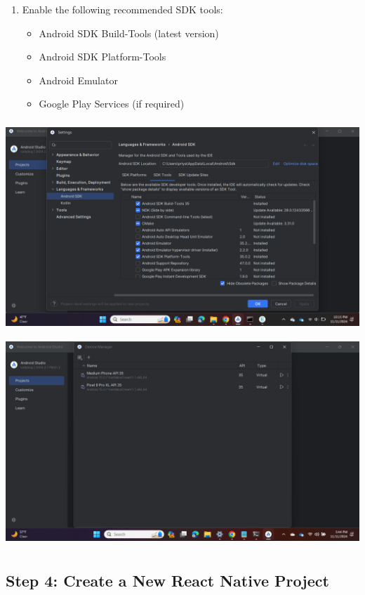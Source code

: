 \documentclass{article}
\begin{document}
\begin{enumerate}
    \item Enable the following recommended SDK tools:
    \begin{itemize}
        \item Android SDK Build-Tools (latest version)
        \item Android SDK Platform-Tools
        \item Android Emulator
        \item Google Play Services (if required)
    \end{itemize}
\end{enumerate}
\includegraphics[width=5.57813in,height=3.13391in]{media/image31.png}
\includegraphics[width=5.57813in,height=3.13391in]{media/image22.png}
    
\subsection*{Step 4: Create a New React Native Project}
\end{document}

